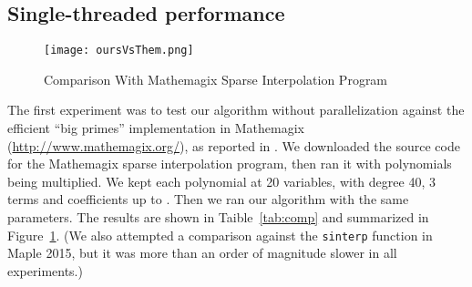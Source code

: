 \documentclass[letterpaper,10pt]{article}
\def\cite{\citep}
\begin{document}
\subsection{Single-threaded performance}


\begin{figure}[tbp]
\texttt{[image: oursVsThem.png]}
\caption{Comparison With Mathemagix Sparse Interpolation Program\label{fig:comparison}}
\end{figure}

The first experiment was to test our algorithm 
without parallelization against
the efficient ``big primes'' implementation in Mathemagix 
(\url{http://www.mathemagix.org/}), as
reported in \cite{HL15}.
We downloaded the source code for the Mathemagix sparse
interpolation program, then ran it with  polynomials 
being multiplied. We kept each polynomial at 20 variables, with degree 40, 3 terms 
and coefficients up to . Then we ran our algorithm with the same parameters. 
The results are shown in Taible~\ref{tab:comp} and summarized in
Figure~\ref{fig:comparison}. 
(We also
attempted a comparison against the \texttt{sinterp} function in Maple 2015,
but it was more than an order of magnitude slower in all experiments.)
\end{document}
